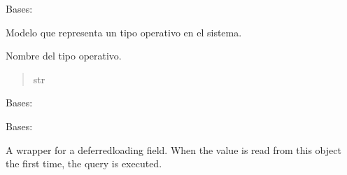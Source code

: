 \documentclass[letterpaper,10pt,spanish]{sphinxmanual}
\begin{document}
\begin{fulllineitems}

\pysigstartsignatures
{}
\pysigstopsignatures
\sphinxAtStartPar
Bases: 

\sphinxAtStartPar
Modelo que representa un tipo operativo en el sistema.


\begin{fulllineitems}

\pysigstartsignatures
{}
\pysigstopsignatures
\sphinxAtStartPar
Nombre del tipo operativo.
\begin{quote}\begin{description}
\sphinxAtStartPar
str

\end{description}\end{quote}

\end{fulllineitems}



\begin{fulllineitems}

\pysigstartsignatures
{}
\pysigstopsignatures
\sphinxAtStartPar
Bases: 

\end{fulllineitems}



\begin{fulllineitems}

\pysigstartsignatures
{}
\pysigstopsignatures
\sphinxAtStartPar
Bases: 

\end{fulllineitems}



\begin{fulllineitems}

\pysigstartsignatures
{}
\pysigstopsignatures
\sphinxAtStartPar
A wrapper for a deferred\sphinxhyphen{}loading field. When the value is read from this
object the first time, the query is executed.


\end{fulllineitems}
\end{fulllineitems}
\end{document}
